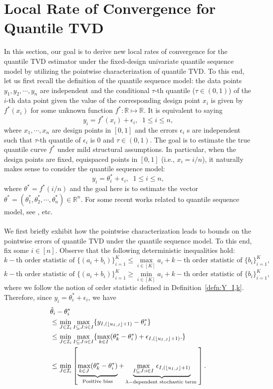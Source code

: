 \documentclass[11pt]{article}
\newcommand{\I}{\mathcal{I}}
\newcommand{\bR}{\mathbb{R}}
\theoremstyle{plain}
\theoremstyle{definition}
\theoremstyle{remark}
\begin{document}
\section{Local Rate of Convergence for Quantile TVD}\label{sec:ptwise_error}
In this section, our goal is to derive new local rates of convergence for the quantile TVD estimator under the fixed-design univariate quantile sequence model by utilizing the pointwise characterization of quantile TVD. To this end, let us first recall the definition of the quantile sequence model: the data points $y_1,y_2,\cdots,y_n$ are independent and the conditional $\tau$-th quantile ($\tau\in (0,1)$) of the $i$-th data point given the value of the corresponding design point $x_i$ is given by $f^*(x_i)$ for some unknown function $f^*:\bR \mapsto \bR$. It is equivalent to saying 
\[y_i=f^*(x_i)+\epsilon_i,\;\;1\leq i \leq n,\]
    where $x_1,\cdots, x_n$ are design points in $[0,1]$ and the errors $\epsilon_i$ s are independent such that $\tau$-th quantile of $\epsilon_i$ is $0$ and $\tau \in (0,1)$. The goal is to estimate the true quantile curve $f^*$ under mild structural assumptions. In particular, when the design points are fixed, equispaced points in $[0,1]$ (i.e., $x_i=i/n$), it naturally makes sense to consider the quantile sequence model:
    \[y_i=\theta^*_i+\epsilon_i,\;\;1\leq i \leq n,\]
    where $\theta^*=f^*(i/n)$ and the goal here is to estimate the vector $\theta^*=(\theta^*_1,\theta^*_2,\cdots,\theta^*_n)\in \mathbb{R}^n$. 
    For some recent works related to quantile sequence model, see \cite{madrid2022risk,madrid2024quantile}, etc.\\
    \\
    We first briefly exhibit how the pointwise characterization leads to bounds on the pointwise errors of quantile TVD under the quantile sequence model. To this end, fix some $i\in [n]$. Observe that the following deterministic inequalities hold:
    \[k-\text{th order statistic of }\{(a_i+b_i)\}_{i=1}^{K}\leq \max_{i \in [K]} a_i+  k-\text{th order statistic of }\{b_i\}_{i=1}^{K},\]
     \[k-\text{th order statistic of }\{(a_i+b_i)\}_{i=1}^{K}\geq \min_{i \in [K]} a_i+  k-\text{th order statistic of }\{b_i\}_{i=1}^{K},\]
    where we follow the notion of order statistic defined in Definition~\ref{defn:Y_I,k}. 
    Therefore, since $y_i=\theta^*_i+\epsilon_i$, we have
     \begin{align}\label{eqn:bias_sd}
   & \hat{\theta}_i-\theta^*_i\nonumber\\
 &\leq  \min_{J \in \I_i}\max_{I\subseteq J: i \in I}\{y_{I,(\lfloor u_{I,J}\rfloor+1)}-\theta^*_i\}\nonumber\allowdisplaybreaks\\
 &\leq  \min_{J \in \I_i}\max_{I\subseteq J: i \in I}\{\max_{k \in I}(\theta^*_k-\theta^*_i)+\epsilon_{I,(\lfloor u_{I,J}\rfloor+1)}.\}\nonumber\allowdisplaybreaks\\
 &\leq  \min_{J \in \I_i}\left[\underbrace{\max_{k \in J} (\theta^*_k-\theta^*_i)}_{\text{ Positive bias }}+\underbrace{\max_{I\subseteq J: i \in I}\,\epsilon_{I,(\lfloor u_{I,J}\rfloor+1)}}_{\lambda-\text{dependent stochastic term }}\right].
\end{align}
\end{document}
